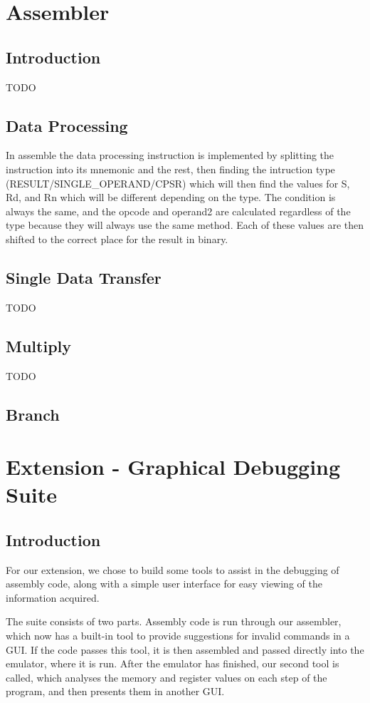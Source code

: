 \documentclass[11pt]{article}
\begin{document}
\section{Assembler}
\subsection{Introduction}
TODO

\subsection{Data Processing}
In assemble the data processing instruction is implemented by splitting the instruction into its mnemonic and the rest, then finding the intruction type (RESULT/SINGLE\_OPERAND/CPSR) which will then find the values for S, Rd, and Rn which will be different depending on the type. The condition is always the same, and the opcode and operand2 are calculated regardless of the type because they will always use the same method. Each of these values are then shifted to the correct place for the result in binary.

\subsection{Single Data Transfer}
TODO

\subsection{Multiply}
TODO

\subsection{Branch}

\section{Extension - Graphical Debugging Suite}
\subsection{Introduction}
For our extension, we chose to build some tools to assist in the debugging of assembly code, along with a simple user interface for easy viewing of the information acquired.

The suite consists of two parts. Assembly code is run through our assembler, which now has a built-in tool to provide suggestions for invalid commands in a GUI. If the code passes this tool, it is then assembled and passed directly into the emulator, where it is run. After the emulator has finished, our second tool is called, which analyses the memory and register values on each step of the program, and then presents them in another GUI. 
\end{document}
